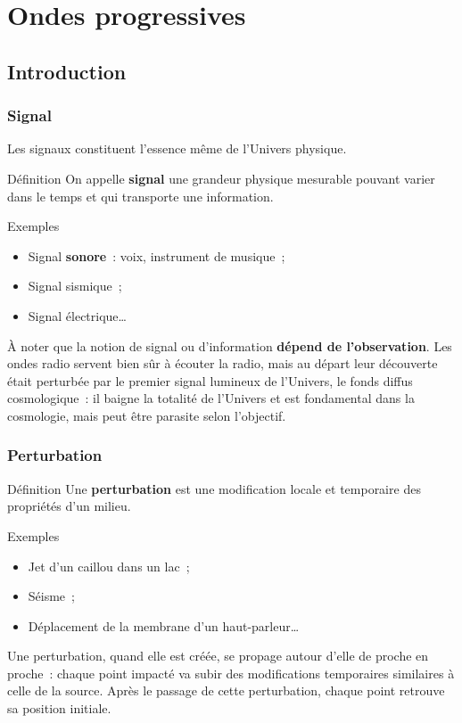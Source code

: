 \documentclass[../main/main.tex]{subfiles}
\begin{document}
\setcounter{chapter}{0}

\chapter{Ondes progressives}


\section{Introduction}
\subsection{Signal}
Les signaux constituent l'essence même de l'Univers physique.
\begin{rdefi}{\tiny Définition}
    On appelle \textbf{signal} une grandeur physique mesurable pouvant varier
    dans le temps et qui transporte une information.
\end{rdefi}
\begin{rexem}{Exemples}
    \begin{itemize}
        \item Signal \textbf{sonore}~: voix, instrument de musique~;
        \item Signal sismique~;
        \item Signal électrique…
    \end{itemize}
\end{rexem}
À noter que la notion de signal ou d'information \textbf{dépend de
l'observation}. Les ondes radio servent bien sûr à écouter la radio, mais au
départ leur découverte était perturbée par le premier signal lumineux de
l'Univers, le fonds diffus cosmologique~: il baigne la totalité de l'Univers et
est fondamental dans la cosmologie, mais peut être parasite selon l'objectif.

\subsection{Perturbation}

\begin{rdefi}{\tiny Définition}
    Une \textbf{perturbation} est une modification locale et temporaire des
    propriétés d’un milieu.
\end{rdefi}
\begin{rexem}{Exemples}
    \begin{itemize}
        \item Jet d'un caillou dans un lac~;
        \item Séisme~;
        \item Déplacement de la membrane d'un haut-parleur…
    \end{itemize} 
\end{rexem}
Une perturbation, quand elle est créée, se propage autour d'elle de proche en
proche~: chaque point impacté va subir des modifications temporaires similaires
à celle de la source. Après le passage de cette perturbation, chaque point
retrouve sa position initiale.
\end{document}
